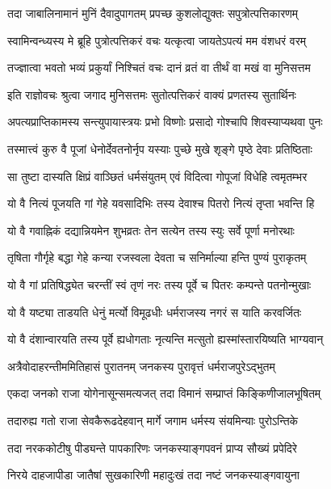 \twolineshloka
{तदा जाबालिनामानं मुनिं दैवादुपागतम्}
{प्रपच्छ कुशलोद्युक्तः सपुत्रोत्पत्तिकारणम्}%


\twolineshloka
{स्वामिन्वन्ध्यस्य मे ब्रूहि पुत्रोत्पत्तिकरं वचः}
{यत्कृत्वा जायतेऽपत्यं मम वंशधरं वरम्}%

\twolineshloka
{तज्ज्ञात्वा भवतो भव्यं प्रकुर्यां निश्चितं वचः}
{दानं व्रतं वा तीर्थं वा मखं वा मुनिसत्तम}%

\twolineshloka
{इति राज्ञोवचः श्रुत्वा जगाद मुनिसत्तमः}
{सुतोत्पत्तिकरं वाक्यं प्रणतस्य सुतार्थिनः}%

\twolineshloka
{अपत्यप्राप्तिकामस्य सन्त्युपायास्त्रयः प्रभो}
{विष्णोः प्रसादो गोश्चापि शिवस्याप्यथवा पुनः}%

\twolineshloka
{तस्मात्त्वं कुरु वै पूजां धेनोर्देवतनोर्नृप}
{यस्याः पुच्छे मुखे शृङ्गे पृष्ठे देवाः प्रतिष्ठिताः}%

\twolineshloka
{सा तुष्टा दास्यति क्षिप्रं वाञ्छितं धर्मसंयुतम्}
{एवं विदित्वा गोपूजां विधेहि त्वमृतम्भर}%

\twolineshloka
{यो वै नित्यं पूजयति गां गेहे यवसादिभिः}
{तस्य देवाश्च पितरो नित्यं तृप्ता भवन्ति हि}%

\twolineshloka
{यो वै गवाह्निकं दद्यान्नियमेन शुभव्रतः}
{तेन सत्येन तस्य स्युः सर्वे पूर्णा मनोरथाः}%

\twolineshloka
{तृषिता गौर्गृहे बद्धा गेहे कन्या रजस्वला}
{देवता च सनिर्माल्या हन्ति पुण्यं पुराकृतम्}%

\twolineshloka
{यो वै गां प्रतिषिद्ध्येत चरन्तीं स्वं तृणं नरः}
{तस्य पूर्वे च पितरः कम्पन्ते पतनोन्मुखाः}%

\twolineshloka
{यो वै यष्ट्या ताडयति धेनुं मर्त्यो विमूढधीः}
{धर्मराजस्य नगरं स याति करवर्जितः}%

\twolineshloka
{यो वै दंशान्वारयति तस्य पूर्वे ह्यधोगताः}
{नृत्यन्ति मत्सुतो ह्यस्मांस्तारयिष्यति भाग्यवान्}%

\twolineshloka
{अत्रैवोदाहरन्तीममितिहासं पुरातनम्}
{जनकस्य पुरावृत्तं धर्मराजपुरेऽद्भुतम्}%

\twolineshloka
{एकदा जनको राजा योगेनासून्समत्यजत्}
{तदा विमानं सम्प्राप्तं किङ्किणीजालभूषितम्}%

\twolineshloka
{तदारुह्य गतो राजा सेवकैरूढदेहवान्}
{मार्गे जगाम धर्मस्य संयमिन्याः पुरोऽन्तिके}%

\twolineshloka
{तदा नरककोटीषु पीड्यन्ते पापकारिणः}
{जनकस्याङ्गपवनं प्राप्य सौख्यं प्रपेदिरे}%

\twolineshloka
{निरये दाहजापीडा जातैषां सुखकारिणी}
{महादुःखं तदा नष्टं जनकस्याङ्गवायुना}%

